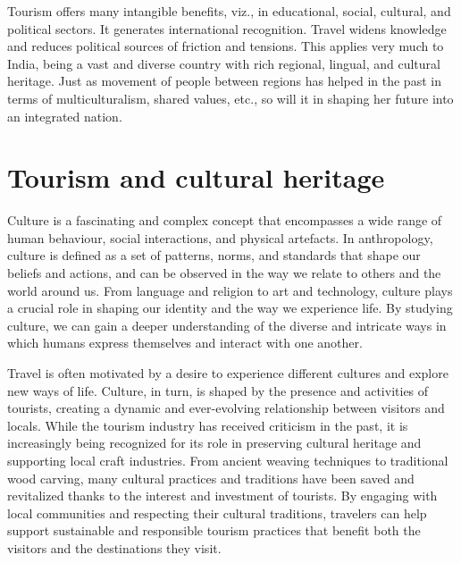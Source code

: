 Tourism offers many intangible benefits, viz., in educational, social, cultural, and political sectors. It generates international recognition. Travel widens knowledge and reduces political sources of friction and tensions. This applies very much to India, being a vast and diverse country with rich regional, lingual, and cultural heritage. Just as movement of people between regions has helped in the past in terms of multiculturalism, shared values, etc., so will it in shaping her future into an integrated nation.


\section{Tourism and cultural heritage} %
\label{sec:tch}

Culture is a fascinating and complex concept that encompasses a wide range of human behaviour, social interactions, and physical artefacts. In anthropology, culture is defined as a set of patterns, norms, and standards that shape our beliefs and actions, and can be observed in the way we relate to others and the world around us. From language and religion to art and technology, culture plays a crucial role in shaping our identity and the way we experience life. By studying culture, we can gain a deeper understanding of the diverse and intricate ways in which humans express themselves and interact with one another.

Travel is often motivated by a desire to experience different cultures and explore new ways of life. Culture, in turn, is shaped by the presence and activities of tourists, creating a dynamic and ever-evolving relationship between visitors and locals. While the tourism industry has received criticism in the past, it is increasingly being recognized for its role in preserving cultural heritage and supporting local craft industries. From ancient weaving techniques to traditional wood carving, many cultural practices and traditions have been saved and revitalized thanks to the interest and investment of tourists. By engaging with local communities and respecting their cultural traditions, travelers can help support sustainable and responsible tourism practices that benefit both the visitors and the destinations they visit.


